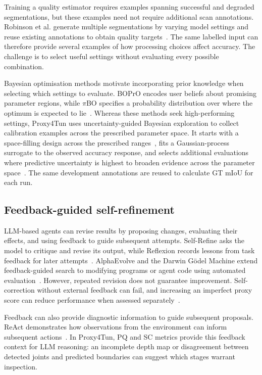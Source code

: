 \documentclass[a4paper,fleqn]{cas-dc}
\begin{document}
{Training a quality estimator requires examples spanning successful and degraded segmentations, but these examples need not require additional scan annotations. Robinson et al. generate multiple segmentations by varying model settings and reuse existing annotations to obtain quality targets~\cite{robinson2018segmentationQuality}. The same labelled input can therefore provide several examples of how processing choices affect accuracy. The challenge is to select useful settings without evaluating every possible combination.

Bayesian optimisation methods motivate incorporating prior knowledge when selecting which settings to evaluate. BOPrO encodes user beliefs about promising parameter regions, while $\pi$BO specifies a probability distribution over where the optimum is expected to lie~\cite{souza2020prior,hvarfner2022pibo}. Whereas these methods seek high-performing settings, Proxy4Tun uses uncertainty-guided Bayesian exploration to collect calibration examples across the prescribed parameter space. It starts with a space-filling design across the prescribed ranges~\cite{joe2008constructing}, fits a Gaussian-process surrogate to the observed accuracy response, and selects additional evaluations where predictive uncertainty is highest to broaden evidence across the parameter space~\cite{gramacy2009adaptive,gramacy2020surrogates}. The same development annotations are reused to calculate GT mIoU for each run.

\subsection{Feedback-guided self-refinement}

LLM-based agents can revise results by proposing changes, evaluating their effects, and using feedback to guide subsequent attempts. Self-Refine asks the model to critique and revise its output, while Reflexion records lessons from task feedback for later attempts~\cite{madaan2023selfrefine,shinn2023reflexion}. AlphaEvolve and the Darwin G\"odel Machine extend feedback-guided search to modifying programs or agent code using automated evaluation~\cite{novikov2025alphaevolve,zhang2025darwin}. However, repeated revision does not guarantee improvement. Self-correction without external feedback can fail, and increasing an imperfect proxy score can reduce performance when assessed separately~\cite{huang2024selfcorrect,gao2023overoptimization}.

Feedback can also provide diagnostic information to guide subsequent proposals. ReAct demonstrates how observations from the environment can inform subsequent actions~\cite{yao2023react}. In Proxy4Tun, PQ and SC metrics provide this feedback context for LLM reasoning: an incomplete depth map or disagreement between detected joints and predicted boundaries can suggest which stages warrant inspection.

}
\end{document}
